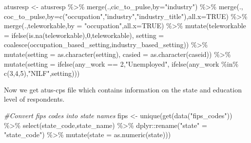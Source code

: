 \documentclass[
]{article}
\newenvironment{Shaded}{\begin{snugshade}}{\end{snugshade}}
\newcommand{\AttributeTok}[1]{\textcolor[rgb]{0.77,0.63,0.00}{#1}}
\newcommand{\CommentTok}[1]{\textcolor[rgb]{0.56,0.35,0.01}{\textit{#1}}}
\newcommand{\ConstantTok}[1]{\textcolor[rgb]{0.00,0.00,0.00}{#1}}
\newcommand{\DecValTok}[1]{\textcolor[rgb]{0.00,0.00,0.81}{#1}}
\newcommand{\FunctionTok}[1]{\textcolor[rgb]{0.00,0.00,0.00}{#1}}
\newcommand{\NormalTok}[1]{#1}
\newcommand{\OtherTok}[1]{\textcolor[rgb]{0.56,0.35,0.01}{#1}}
\newcommand{\SpecialCharTok}[1]{\textcolor[rgb]{0.00,0.00,0.00}{#1}}
\newcommand{\StringTok}[1]{\textcolor[rgb]{0.31,0.60,0.02}{#1}}
\begin{document}
\begin{Shaded}
\begin{Highlighting}[]
\NormalTok{atusresp }\OtherTok{\textless{}{-}}\NormalTok{ atusresp }\SpecialCharTok{\%\textgreater{}\%} 
  \FunctionTok{merge}\NormalTok{(.,cic\_to\_pulse,}\AttributeTok{by=}\StringTok{"industry"}\NormalTok{) }\SpecialCharTok{\%\textgreater{}\%}
  \FunctionTok{merge}\NormalTok{(., coc\_to\_pulse,}\AttributeTok{by=}\FunctionTok{c}\NormalTok{(}\StringTok{"occupation"}\NormalTok{,}\StringTok{"industry"}\NormalTok{,}\StringTok{"industry\_title"}\NormalTok{),}\AttributeTok{all.x=}\ConstantTok{TRUE}\NormalTok{) }\SpecialCharTok{\%\textgreater{}\%}
  \FunctionTok{merge}\NormalTok{(.,teleworkable,}\AttributeTok{by =} \StringTok{"occupation"}\NormalTok{,}\AttributeTok{all.x=}\ConstantTok{TRUE}\NormalTok{) }\SpecialCharTok{\%\textgreater{}\%}
  \FunctionTok{mutate}\NormalTok{(}\AttributeTok{teleworkable =} \FunctionTok{ifelse}\NormalTok{(}\FunctionTok{is.na}\NormalTok{(teleworkable),}\DecValTok{0}\NormalTok{,teleworkable),}
         \AttributeTok{setting =} \FunctionTok{coalesce}\NormalTok{(occupation\_based\_setting,industry\_based\_setting)) }\SpecialCharTok{\%\textgreater{}\%} 
  \FunctionTok{mutate}\NormalTok{(}\AttributeTok{setting =} \FunctionTok{as.character}\NormalTok{(setting),}
         \AttributeTok{casied =} \FunctionTok{as.character}\NormalTok{(caseid)) }\SpecialCharTok{\%\textgreater{}\%}
  \FunctionTok{mutate}\NormalTok{(}\AttributeTok{setting =} \FunctionTok{ifelse}\NormalTok{(any\_work }\SpecialCharTok{==} \DecValTok{2}\NormalTok{,}\StringTok{"Unemployed"}\NormalTok{,}
                          \FunctionTok{ifelse}\NormalTok{(any\_work }\SpecialCharTok{\%in\%} \FunctionTok{c}\NormalTok{(}\DecValTok{3}\NormalTok{,}\DecValTok{4}\NormalTok{,}\DecValTok{5}\NormalTok{),}\StringTok{"NILF"}\NormalTok{,setting)))}
\end{Highlighting}
\end{Shaded}

Now we get atus-cps file which contains information on the state and
education level of respondents.

\begin{Shaded}
\begin{Highlighting}[]
\CommentTok{\#Convert fips codes into state names}
\NormalTok{fips }\OtherTok{\textless{}{-}} \FunctionTok{unique}\NormalTok{(}\FunctionTok{get}\NormalTok{(}\FunctionTok{data}\NormalTok{(}\StringTok{"fips\_codes"}\NormalTok{)) }\SpecialCharTok{\%\textgreater{}\%} 
              \FunctionTok{select}\NormalTok{(state\_code,state\_name) }\SpecialCharTok{\%\textgreater{}\%} 
\NormalTok{              dplyr}\SpecialCharTok{::}\FunctionTok{rename}\NormalTok{(}\StringTok{"state"} \OtherTok{=} \StringTok{"state\_code"}\NormalTok{) }\SpecialCharTok{\%\textgreater{}\%}
              \FunctionTok{mutate}\NormalTok{(}\AttributeTok{state =} \FunctionTok{as.numeric}\NormalTok{(state)))}
\end{Highlighting}
\end{Shaded}
\end{document}
